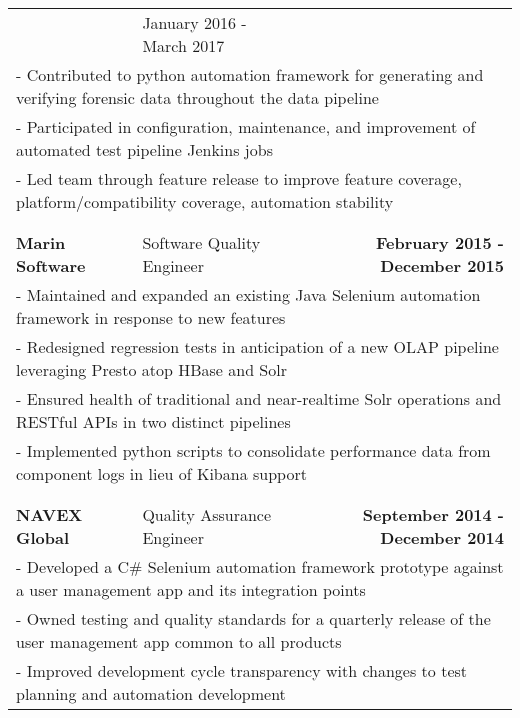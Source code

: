 \documentclass[letterpaper]{article}
\begin{document}
\begin{center}
\begin{tabular}{p{}p{}r}
				&
				{January 2016 - March 2017 \quad\quad\quad\quad}
			\\
				\multicolumn{3}{p{\textwidth}}{\quad\quad - Contributed to python automation framework for generating and verifying forensic data throughout the data pipeline} 
			\\
				\multicolumn{3}{p{\textwidth}}{\quad\quad - Participated in configuration, maintenance, and improvement of automated test pipeline Jenkins jobs}
			\\
				\multicolumn{3}{p{\textwidth}}{\quad\quad - Led team through feature release to improve feature coverage, platform/compatibility coverage, automation stability}  
			\\
			\\
			\\ %
				\textbf{Marin Software}									&
				Software Quality Engineer										&
				\textbf{February 2015 - December 2015 \quad}
			\\
				\multicolumn{3}{p{\textwidth}}{\quad\quad - Maintained and expanded an existing Java Selenium automation framework in response to new features} 
			\\
				\multicolumn{3}{p{\textwidth}}{\quad\quad - Redesigned regression tests in anticipation of a new OLAP pipeline leveraging Presto atop HBase and Solr} 
			\\
				\multicolumn{3}{p{\textwidth}}{\quad\quad - Ensured health of traditional and near-realtime Solr operations and RESTful APIs in two distinct pipelines } 
			\\
				\multicolumn{3}{p{\textwidth}}{\quad\quad - Implemented python scripts to consolidate performance data from component logs in lieu of Kibana support } 
			\\
			\\
			\\ %
				\textbf{NAVEX Global}									&
				Quality Assurance Engineer										&
				\textbf{September 2014 - December 2014 \quad}
			\\
				\multicolumn{3}{p{\textwidth}}{\quad\quad - Developed a C\# Selenium automation framework prototype against a user management app and its integration points} 
			\\
				\multicolumn{3}{p{\textwidth}}{\quad\quad - Owned testing and quality standards for a quarterly release of the user management app common to all products} 
			\\
				\multicolumn{3}{p{\textwidth}}{\quad\quad - Improved development cycle transparency with changes to test planning and automation development} 

\end{tabular}
\end{center}
\end{document}
